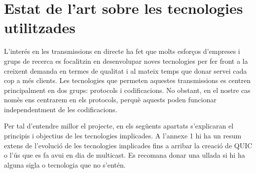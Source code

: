 \section{Estat de l'art sobre les tecnologies utilitzades}
{
    L'interés en les transmissions en directe ha fet que molts esforços d'empreses i grups de recerca
    es focalitzin en desenvolupar noves tecnologies per fer front a la creixent demanda en termes de qualitat
    i al mateix temps que donar servei cada cop a més clients. Les tecnologies que permeten aquestes transmissions
    es centren principalment en dos grups: protocols i codificacions. No obstant, en el nostre cas nomès ens centrarem
    en els protocols, perquè aquests poden funcionar independentment de les codificacions.

    Per tal d'entendre millor el projecte, en els següents apartats s'explicaran el principis i objectius de les
    tecnologies implicades. A l'annexe 1 hi ha un resum extens de l'evolució de les tecnologies implicades fins a arribar 
    la creació de QUIC o l'ús que es fa avui en dia de multicast. Es recomana donar una ullada si hi ha alguna sigla o tecnologia 
    que no s'entén.
}


